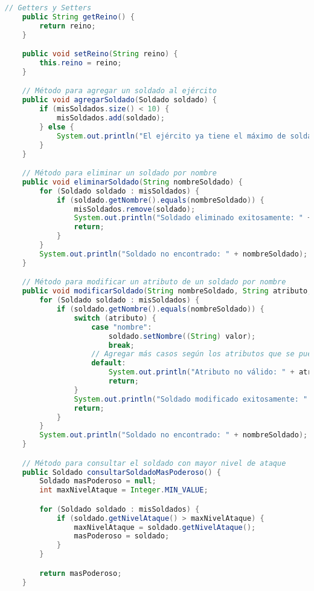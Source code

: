 \documentclass{article}
\begin{document}
\begin{itemize}
\begin{itemize}
\begin{lstlisting}[language=java]
    // Getters y Setters
    public String getReino() {
        return reino;
    }

    public void setReino(String reino) {
        this.reino = reino;
    }

    // Método para agregar un soldado al ejército
    public void agregarSoldado(Soldado soldado) {
        if (misSoldados.size() < 10) {
            misSoldados.add(soldado);
        } else {
            System.out.println("El ejército ya tiene el máximo de soldados permitidos (10).");
        }
    }

    // Método para eliminar un soldado por nombre
    public void eliminarSoldado(String nombreSoldado) {
        for (Soldado soldado : misSoldados) {
            if (soldado.getNombre().equals(nombreSoldado)) {
                misSoldados.remove(soldado);
                System.out.println("Soldado eliminado exitosamente: " + nombreSoldado);
                return;
            }
        }
        System.out.println("Soldado no encontrado: " + nombreSoldado);
    }

    // Método para modificar un atributo de un soldado por nombre
    public void modificarSoldado(String nombreSoldado, String atributo, Object valor) {
        for (Soldado soldado : misSoldados) {
            if (soldado.getNombre().equals(nombreSoldado)) {
                switch (atributo) {
                    case "nombre":
                        soldado.setNombre((String) valor);
                        break;
                    // Agregar más casos según los atributos que se puedan modificar
                    default:
                        System.out.println("Atributo no válido: " + atributo);
                        return;
                }
                System.out.println("Soldado modificado exitosamente: " + nombreSoldado);
                return;
            }
        }
        System.out.println("Soldado no encontrado: " + nombreSoldado);
    }

    // Método para consultar el soldado con mayor nivel de ataque
    public Soldado consultarSoldadoMasPoderoso() {
        Soldado masPoderoso = null;
        int maxNivelAtaque = Integer.MIN_VALUE;

        for (Soldado soldado : misSoldados) {
            if (soldado.getNivelAtaque() > maxNivelAtaque) {
                maxNivelAtaque = soldado.getNivelAtaque();
                masPoderoso = soldado;
            }
        }

        return masPoderoso;
    }


\end{lstlisting}
\end{itemize}
\end{itemize}
\end{document}
